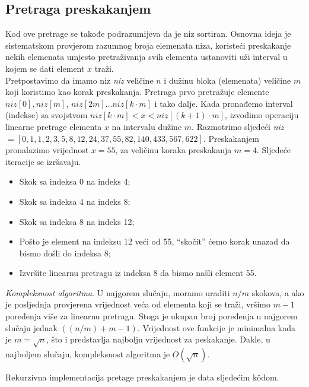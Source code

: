 \subsection{Pretraga preskakanjem}

Kod ove pretrage se takođe podrazumijeva da je niz sortiran.  Osnovna ideja je sistematskom provjerom razumnog broja elemenata niza,  koristeći preskakanje nekih elemenata umjesto pretraživanja svih elementa  ustanoviti uži interval u kojem se dati element $x$ traži. \\

Pretpostavimo da imamo niz \emph{niz} veličine $n$ i dužinu bloka (elemenata) veličine $m$ koji koristimo kao korak preskakanja. Pretraga prvo pretražuje elemente $niz[0], niz[m]$, $niz[2m] \ldots niz[k \cdot m]$ i tako dalje. Kada pronađemo interval (indekse) sa svojstvom $niz[k\cdot m] < x < niz[(k+1) \cdot m]$, izvodimo operaciju linearne pretrage elementa $x$ na intervalu dužine $m$.  Razmotrimo sljedeći \emph{niz}$=[0, 1, 1, 2, 3, 5, 8, 12, 24, 37, 55, 82, 140, 433, 567, 622]$. Preskakanjem pronalazimo vrijednost $x=55$, za veličinu koraka preskakanja $m=4$. Sljedeće iteracije se izršavaju. 
 \begin{itemize}
 	\item  Skok sa indeksa 0 na indeks 4;
 	\item   Skok sa indeksa 4 na indeks 8;
 	\item   Skok sa indeksa 8 na indeks 12;
 	\item  Pošto je element na indeksu 12 veći od 55, ``skočit'' ćemo korak unazad da bismo došli do indeksa 8;
 	\item  Izvršite linearnu pretragu iz indeksa 8 da bismo našli element 55.
 \end{itemize}
 
 \textit{Kompleksnost algoritma}. U najgorem slučaju, moramo uraditi $n/m$ skokova, a ako je posljednja provjerena vrijednost veća od elementa koji se traži, vršimo $m-1$ poređenja više za linearnu pretragu. Stoga je ukupan broj poređenja u najgorem slučaju jednak $((n/m) + m-1)$. Vrijednost ove funkcije  je minimalna kada je $m = \sqrt{n}$, što i predstavlja najbolju vrijednost za peskakanje. Dakle, u najboljem slučaju, kompleksnost algoritma je $O(\sqrt{n})$. 
 
 
Rekurzivna implementacija pretage preskakanjem  je data sljedećim k\^odom.  %
 
